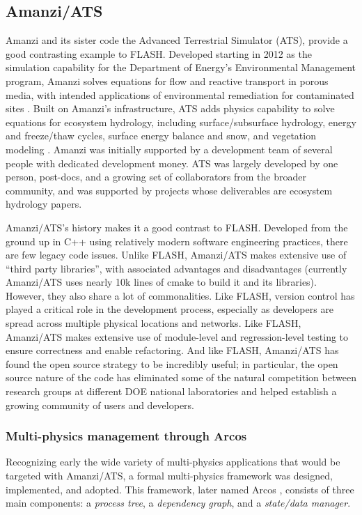\subsection{Amanzi/ATS}
\label{sec:amanzi}
%
Amanzi and its sister code the Advanced Terrestrial Simulator (ATS), provide a good contrasting example to FLASH.
Developed starting in 2012 as the simulation capability for the Department of Energy's Environmental Management program, Amanzi solves equations for flow and reactive transport in porous media, with intended applications of environmental remediation for contaminated sites \cite{MoultonMD12}.
Built on Amanzi's infrastructure, ATS adds physics capability to solve equations for ecosystem hydrology, including surface/subsurface hydrology, energy and freeze/thaw cycles, surface energy balance and snow, and vegetation modeling \cite{PainterMW13,AtchleyPHC15}.
Amanzi was initially supported by a development team of several people with dedicated development money.
ATS was largely developed by one person, post-docs, and a growing set of collaborators from the broader community, and was supported by projects whose deliverables are ecosystem hydrology papers.

Amanzi/ATS's history makes it a good contrast to FLASH.
Developed from the ground up in C++ using relatively modern software engineering practices, there are few legacy code issues.
Unlike FLASH, Amanzi/ATS makes extensive use of ``third party libraries'', with associated advantages and disadvantages (currently Amanzi/ATS uses nearly 10k lines of cmake to build it and its libraries).
However, they also share a lot of commonalities.
Like FLASH, version control has played a critical role in the development process, especially as developers are spread across multiple physical locations and networks.
Like FLASH, Amanzi/ATS makes extensive use of module-level and regression-level testing to ensure correctness and enable refactoring.
And like FLASH, Amanzi/ATS has found the open source strategy to be incredibly useful; in particular, the open source nature of the code has eliminated some of the natural competition between research groups at different DOE national laboratories and helped establish a growing community of users and developers.

\subsubsection{Multi-physics management through Arcos}
\label{sec:amanzi:arcos}
Recognizing early the wide variety of multi-physics applications that would be targeted with Amanzi/ATS, a formal multi-physics framework was designed, implemented, and adopted.
This framework, later named Arcos \cite{CoonMP16}, consists of three main components: a \emph{process tree}, a \emph{dependency graph}, and a \emph{state/data manager}.

